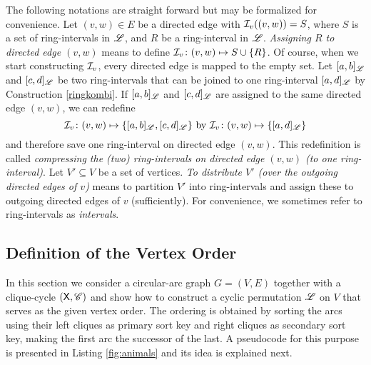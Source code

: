 \documentclass[10pt]{article}
\begin{document}
The following notations are straight forward but may be formalized for convenience.
Let $(v,w)\in E$ be a directed edge with $\mathcal{I}_v((v,w))= S$, where $S$ is a set of ring-intervals 
in $\mathscr{L}$, and $R$ be a ring-interval in $\mathscr{L}$. \emph{Assigning $R$ to directed edge $(v,w)$} 
means to define $\mathcal{I}_v\colon(v,w)\mapsto S\cup \{R\}$.
Of course, when we start constructing $\mathcal{I}_v$, every directed edge is mapped to the empty set.
Let $[a,b]_{\mathscr{L}}$ and $[c,d]_{\mathscr{L}}$ be two ring-intervals that can be joined to one 
ring-interval $[a,d]_{\mathscr{L}}$ by Construction \ref{ringkombi}. If $[a,b]_{\mathscr{L}}$ and 
$[c,d]_{\mathscr{L}}$ are assigned to the same directed edge $(v,w)$, we can redefine
$$\mathcal{I}_v\colon(v,w)\mapsto\{[a,b]_{\mathscr{L}},[c,d]_{\mathscr{L}}\} \text{ by }
\mathcal{I}_v\colon(v,w)\mapsto\{[a,d]_{\mathscr{L}}\}$$
and therefore save one ring-interval on directed edge $(v,w)$.
This redefinition is called \emph{compressing the (two) ring-intervals on directed edge $(v,w)$ 
(to one ring-interval)}. Let $V'\subseteq V$ be a set of vertices. \emph{To distribute $V'$ (over the outgoing directed edges of $v$)} means to partition 
$V'$ into ring-intervals and assign these to outgoing directed edges of $v$ (sufficiently).
For convenience,
we sometimes refer to ring-intervals as \emph{intervals}.




\subsection{Definition of the Vertex Order}\label{constrCO}





In this section we consider a circular-arc graph $G=(V,E)$ 
together with a clique-cycle $(\mathsf{X},\mathscr{C})$ and show
how to construct a cyclic permutation $\mathscr{L}$ on $V$ 
that serves as the given vertex order. The ordering is obtained by
sorting the arcs using their left cliques as primary sort key
and right cliques as secondary sort key, making the first
arc the successor of the last. A pseudocode for this 
purpose is presented in Listing \ref{fig:animals} and its idea is explained 
next.
\end{document}
